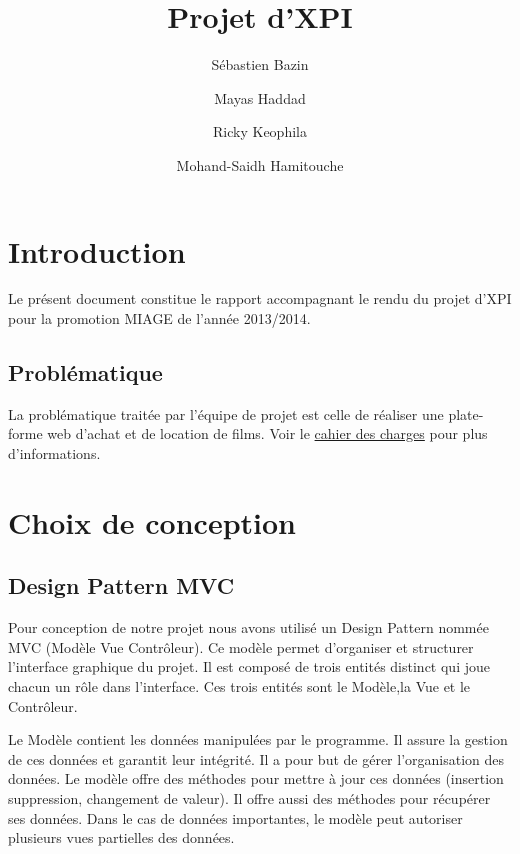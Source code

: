 \documentclass[a4paper,10pt]{report}
\begin{document}
\pagestyle{plain} %


\title{Projet d'XPI}
\author{Sébastien Bazin
\and Mayas Haddad
\and Ricky Keophila
\and Mohand-Saidh Hamitouche}
\maketitle
\tableofcontents

\chapter{Introduction}
Le présent document constitue le rapport accompagnant le rendu du projet d'XPI pour la promotion MIAGE de l'année 2013/2014.

\section{Problématique}
La problématique traitée par l'équipe de projet est celle de réaliser une plate-forme web d'achat et de location de films.
Voir le \href{https://www.lri.fr/~kn/files/projet_xpi_2013.pdf}{cahier des charges} pour plus d'informations.

\chapter{Choix de conception}

\section{Design Pattern MVC}

Pour conception de notre projet nous avons utilisé un Design Pattern nommée MVC (Modèle Vue Contrôleur). Ce modèle permet d'organiser et structurer l'interface graphique du projet.
Il est composé de trois entités distinct qui joue chacun un rôle dans l'interface.
Ces trois entités sont le Modèle,la Vue et le Contrôleur.

Le Modèle contient les données manipulées par le programme. Il assure la gestion de ces données et garantit leur intégrité. Il a pour but de gérer l'organisation des données. 
Le modèle offre des méthodes pour mettre à jour ces données (insertion suppression, changement de valeur). Il offre aussi des méthodes pour récupérer ses données. Dans le cas de données importantes, le modèle peut autoriser plusieurs vues partielles des données. 
\end{document}
